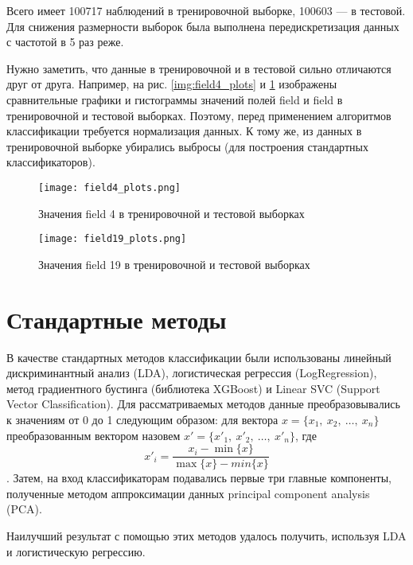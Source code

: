 Всего имеет 100717 наблюдений в тренировочной выборке, 100603 --- в тестовой. Для снижения размерности выборок была выполнена передискретизация данных с частотой в 5 раз реже. 

Нужно заметить, что данные в тренировочной и в тестовой сильно отличаются друг от друга. Например, на рис. \ref{img:field4_plots} и \ref{img:field19_plots} изображены сравнительные графики и гистограммы значений полей field и field  в тренировочной и тестовой выборках. Поэтому, перед применением алгоритмов классификации требуется нормализация данных. К тому же, из данных в тренировочной выборке убирались выбросы (для построения стандартных классификаторов).

\begin{figure}[h!]
 \begin{center}
 \begin{minipage}{0.49\linewidth}
    \texttt{[image: field4\_plots.png]}
   \caption{Значения field 4 в тренировочной и тестовой выборках} \label{img:field4_plots}    
  \end{minipage}  
   \hfill
  \begin{minipage}[h]{0.49\linewidth}
      \texttt{[image: field19\_plots.png]}
    \caption{Значения field 19 в тренировочной и тестовой выборках} \label{img:field19_plots}    
  \end{minipage}  
 \end{center}
\end{figure}

\section{Стандартные методы} 
В качестве стандартных методов классификации были использованы линейный дискриминантный анализ (LDA), логистическая регрессия (LogRegression), метод градиентного бустинга (библиотека XGBoost) и Linear SVC (Support Vector Classification). Для рассматриваемых методов данные преобразовывались к значениям от 0 до 1 следующим образом: для вектора $x=\{x_1,~x_2,~\ldots,~x_n\}$ преобразованным вектором назовем $x'=\{x'_1,~x'_2,~\ldots,~x'_n\}$, где $$x'_i = \frac{x_i - \min\{x\}}{\max\{x\} - min\{x\}}$$.
Затем, на вход классификаторам подавались первые три главные компоненты, полученные методом аппроксимации данных principal component analysis (PCA).

Наилучший результат с помощью этих методов удалось получить, используя LDA и логистическую регрессию.

